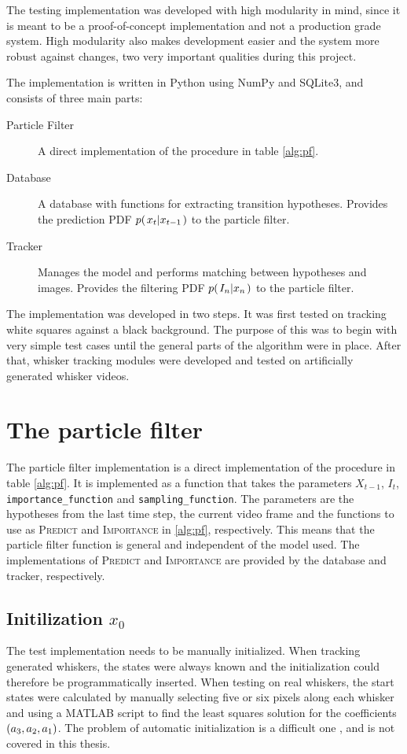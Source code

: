 The testing implementation was developed with high modularity in mind,
since it is meant to be a proof-of-concept implementation and not a
production grade system. High modularity also makes development easier
and the system more robust against changes, two very important
qualities during this project.

The implementation is written in Python using NumPy and SQLite3, and
consists of three main parts:
\begin{description}
  \item[Particle Filter] A direct  implementation of the procedure in
    table \ref{alg:pf}.
  \item[Database] A database with functions for extracting transition
    hypotheses. Provides the prediction PDF $p{(\left. x_t \middle\vert x_{t-1} \right.)}$ to the
    particle filter.
  \item[Tracker] Manages the model and performs matching between
    hypotheses and images. Provides the filtering PDF
    $p{(\left. I_n \middle\vert x_n \right.)}$ to the particle filter.
\end{description}

The implementation was developed in two steps. It was first tested on
tracking white squares against a black background. The purpose of this
was to begin with very simple test cases until the general parts of
the algorithm were in place. After that, whisker tracking modules were
developed and tested on artificially generated whisker videos.

\section{The particle filter}
The particle filter implementation is a direct implementation of the
procedure in table \ref{alg:pf}. It is implemented as a function that
takes the parameters $X_{t-1}$, $I_t$, \texttt{importance\_function} and
\texttt{sampling\_function}. The parameters are the hypotheses from
the last time step, the current video frame and the functions to use
as \textsc{Predict} and \textsc{Importance} in \ref{alg:pf},
respectively. This means that the particle filter function is general
and independent of the model used. The implementations of
\textsc{Predict} and \textsc{Importance} are provided by the database
and tracker, respectively.

\subsection{Initilization $x_0$}
The test implementation needs to be manually initialized. When
tracking generated whiskers, the states were always known and the
initialization could therefore be programmatically inserted. When
testing on real whiskers, the start states were calculated by manually
selecting five or six pixels along each whisker and using a MATLAB
script to find the least squares solution for the coefficients
$\left( a_3, a_2, a_1 \right)$. The problem of automatic
initialization is a difficult one \cite{Hedvig}, and is not covered in
this thesis.

